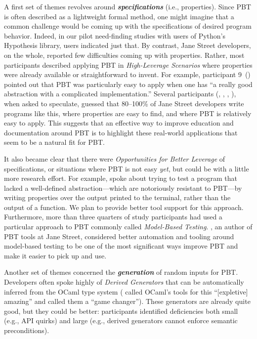 \newcommand{\proptheme}[1]{{\color{nord-orange} \em #1}}
\newcommand{\gentheme}[1]{{\color{nord-green} \em #1}}
\newcommand{\evaltheme}[1]{{\color{nord-purple} \em #1}}
\newcommand{\edutheme}[1]{{\color{nord-frost4} \em #1}}
A first set of
themes revolves around \proptheme{\normalfont \bf specifications} (i.e., 
properties).
Since
PBT is often described as a lightweight formal method, one
might imagine that a common challenge would be coming up with the
specifications of desired program behavior. Indeed, in our pilot need-finding
studies with users of Python's Hypothesis library, users indicated just that.
By contrast, Jane Street developers, on the whole, reported
few difficulties coming up with
properties. Rather, most participants described applying PBT in
\proptheme{High-Leverage Scenarios} where properties were already
available or straightforward to invent. For example, participant 
9~() pointed out that PBT was particularly easy to apply when one
has ``a really good abstraction
with a complicated implementation.''
Several participants (, ,
, ), when asked to speculate, guessed
that 80--100\% of Jane Street
developers write programs like this, where properties are easy to find, and
where PBT is relatively easy to apply.  This suggests that an effective way to
improve education and documentation around PBT is to highlight these real-world 
applications that seem to be a natural fit for PBT.

It also became clear that there were \proptheme{Opportunities for Better
Leverage} of specifications, or situations where PBT is not easy {\em yet}, but 
could be with a
little more research effort. For example,  spoke about trying to 
test a program that lacked a well-defined abstraction---which are notoriously 
resistant to PBT---by
writing properties over the output printed to the terminal, rather than the 
output of a function. We plan to provide better tool support for this approach.
Furthermore, more than three quarters of study participants had used a
particular approach to PBT commonly called
\proptheme{Model-Based Testing}.
, an author of PBT tools at Jane Street, considered better
automation and tooling around model-based testing to be one of the most
significant ways improve PBT and make it easier to pick up and use.

Another set of themes concerned the \gentheme{\normalfont \bf generation} of
random inputs for PBT. Developers often spoke
highly of \gentheme{Derived Generators} that can be automatically inferred from
the OCaml type system ( called OCaml's tools for this
``[expletive] amazing'' and  called them a ``game changer'').
These generators are already quite good, but they could be better: participants
identified deficiencies both small (e.g., API quirks) and large (e.g.,
derived generators
cannot enforce semantic preconditions).

